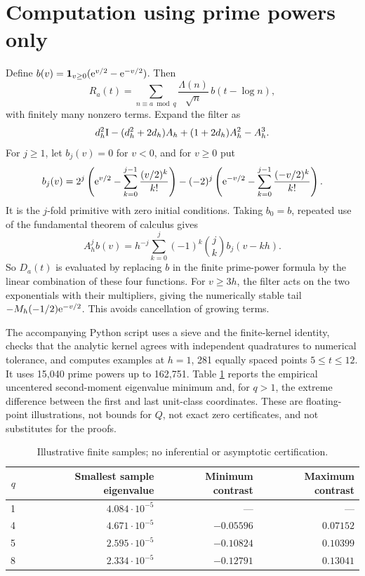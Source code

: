 \documentclass[11pt]{article}
\begin{document}
\section{Computation using prime powers only}
Define $b(v)=\mathbf 1_{v\ge0}(\mathrm e^{v/2}-\mathrm e^{-v/2})$. Then
\[
 R_a(t)=\sum_{n\equiv a\bmod q}\frac{\Lambda(n)}{\sqrt n}\,b(t-\log n),
\]
with finitely many nonzero terms. Expand the filter as
\[
 d_h^2\mathrm I-(d_h^2+2d_h)A_h+(1+2d_h)A_h^2-A_h^3.
\]
For $j\ge1$, let $b_j(v)=0$ for $v<0$, and for $v\ge0$ put
\[
 b_j(v)=2^j\left(\mathrm e^{v/2}-\sum_{k=0}^{j-1}\frac{(v/2)^k}{k!}\right)
 -(-2)^j\left(\mathrm e^{-v/2}-\sum_{k=0}^{j-1}\frac{(-v/2)^k}{k!}\right).
\]
It is the $j$-fold primitive with zero initial conditions. Taking $b_0=b$, repeated use of the fundamental theorem of calculus gives
\[
 A_h^jb(v)=h^{-j}\sum_{k=0}^j(-1)^k\binom jk b_j(v-kh).
\]
So $D_a(t)$ is evaluated by replacing $b$ in the finite prime-power formula by the linear combination of these four functions. For $v\ge3h$, the filter acts on the two exponentials with their multipliers, giving the numerically stable tail $-M_h(-1/2)\mathrm e^{-v/2}$. This avoids cancellation of growing terms.

The accompanying Python script uses a sieve and the finite-kernel identity, checks that the analytic kernel agrees with independent quadratures to numerical tolerance, and computes examples at $h=1$, 281 equally spaced points $5\le t\le12$. It uses 15,040 prime powers up to 162,751. Table \ref{tab:experiment} reports the empirical uncentered second-moment eigenvalue minimum and, for $q>1$, the extreme difference between the first and last unit-class coordinates. These are floating-point illustrations, not bounds for $Q$, not exact zero certificates, and not substitutes for the proofs.
\begin{table}[ht]
 \centering\small
 \begin{tabular}{r r r r}
 \toprule
 $q$&Smallest sample eigenvalue&Minimum contrast&Maximum contrast\\
 \midrule
 1&$4.084\cdot10^{-5}$&---&---\\
 4&$4.671\cdot10^{-5}$&$-0.05596$&$0.07152$\\
 5&$2.595\cdot10^{-5}$&$-0.10824$&$0.10399$\\
 8&$2.334\cdot10^{-5}$&$-0.12791$&$0.13041$\\
 \bottomrule
 \end{tabular}
 \caption{Illustrative finite samples; no inferential or asymptotic certification.}\label{tab:experiment}
\end{table}
\end{document}
